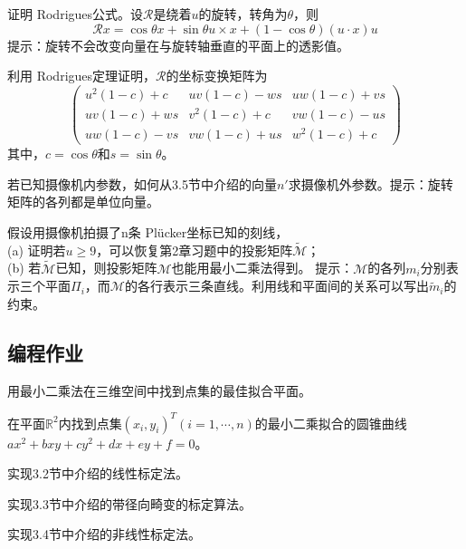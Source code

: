 \begin{problem}
    证明 Rodrigues公式。设$\mathcal{R}$是绕着$u$的旋转，转角为$\theta $，则
    $$\mathcal{R}x=\cos \theta x + \sin \theta u \times x +(1-\cos \theta)(u \cdot x)u$$
    提示：旋转不会改变向量在与旋转轴垂直的平面上的透影值。
\end{problem}

\begin{problem}
    利用 Rodrigues定理证明，$\mathcal{R}$的坐标变换矩阵为
    $$
    \begin{pmatrix}
        u^2(1-c)+c & uv(1-c)-ws & uw(1-c)+vs \\
        uv(1-c)+ws & v^2(1-c)+c & vw(1-c)-us \\
        uw(1-c)-vs & vw(1-c)+us & w^2(1-c)+c
    \end{pmatrix}
    $$
    其中，$c=\cos \theta$和$s=\sin \theta$。
\end{problem}

\begin{problem}
    若已知摄像机内参数，如何从3.5节中介绍的向量$n'$求摄像机外参数。提示：旋转矩阵的各列都是单位向量。
\end{problem}

\begin{problem}
    假设用摄像机拍摄了n条 Pl\"ucker坐标已知的刻线，
    \\(a) 证明若$u\ge 9$，可以恢复第2章习题中的投影矩阵$\widetilde{\mathcal{M}} $；
    \\(b) 若$\widetilde{\mathcal{M}} $已知，则投影矩阵$\mathcal{M}$也能用最小二乘法得到。
    提示：$\mathcal{M}$的各列$m_i$分别表示三个平面$\Pi_i$，而$\mathcal{M}$的各行表示三条直线。利用线和平面间的关系可以写出$\widetilde{m}_i $的约束。
\end{problem}

\subsection{编程作业}

\begin{problem}
    用最小二乘法在三维空间中找到点集的最佳拟合平面。
\end{problem}

\begin{problem}
    在平面$\mathbb{R}^2$内找到点集$(x_i,y_i)^T(i=1,\cdots ,n)$的最小二乘拟合的圆锥曲线 $ax^2+bxy+cy^2+dx+ey+f=0$。
\end{problem}

\begin{problem}
    实现3.2节中介绍的线性标定法。
\end{problem}

\begin{problem}
    实现3.3节中介绍的带径向畸变的标定算法。
\end{problem}

\begin{problem}
    实现3.4节中介绍的非线性标定法。
\end{problem}